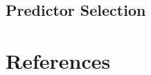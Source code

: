 \documentclass[12pt,twoside]{reedthesis}
\begin{document}
\hypertarget{predselect}{%
\section{Predictor Selection}\label{predselect}}

\backmatter

\hypertarget{references}{%
\chapter*{References}\label{references}}


\noindent

\setlength{\parindent}{-0.20in}
\setlength{\leftskip}{0.20in}
\setlength{\parskip}{8pt}
\end{document}
